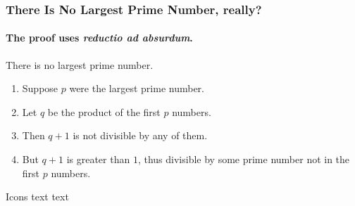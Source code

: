 \documentclass[aspectratio=169]{beamer}
\begin{document}
    \begin{frame}
        \frametitle{There Is No Largest Prime Number, really?}
        \framesubtitle{The proof uses \textit{reductio ad absurdum}.}
        \begin{theorem}
            There is no largest prime number. \end{theorem}
        \begin{enumerate}
            \item<1-| alert@1> Suppose $p$ were the largest prime number.
            \item<2-> Let $q$ be the product of the first $p$ numbers.
            \item<3-> Then $q+1$ is not divisible by any of them.
            \item<1-> But $q + 1$ is greater than $1$, thus divisible by some prime
            number not in the first $p$ numbers.
        \end{enumerate}
    \end{frame}

    \begin{frame}{Icons}
        text  text
    \end{frame}
\end{document}

